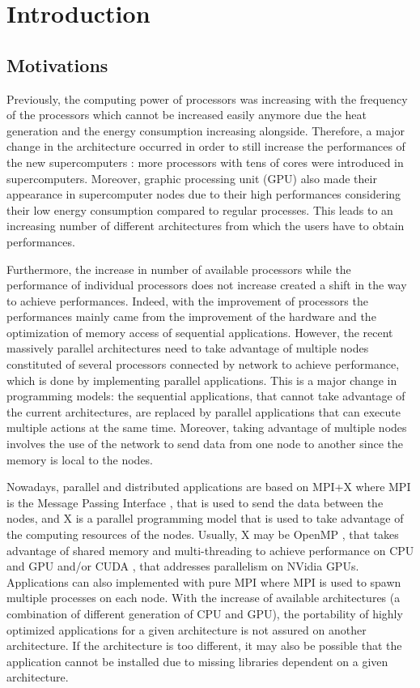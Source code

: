 \chapter{Introduction}

\section{Motivations}
Previously, the computing power of processors was increasing with the frequency of the processors which cannot be increased easily anymore due the heat generation and the energy consumption increasing alongside.
Therefore, a major change in the architecture occurred in order to still increase the performances of the new supercomputers : more processors with tens of cores were introduced in supercomputers.
Moreover, graphic processing unit (GPU) also made their appearance in supercomputer nodes due to their high performances considering their low energy consumption compared to regular processes.
This leads to an increasing number of different architectures from which the users have to obtain performances.

Furthermore, the increase in number of available processors while the performance of individual processors does not increase created a shift in the way to achieve performances.
Indeed, with the improvement of processors the performances mainly came from the improvement of the hardware and the optimization of memory access of sequential applications.
However, the recent massively parallel architectures need to take advantage of multiple nodes constituted of several processors connected by network to achieve performance, which is done by implementing parallel applications.
This is a major change in programming models: the sequential applications, that cannot take advantage of the current architectures, are replaced by parallel applications that can execute multiple actions at the same time.
Moreover, taking advantage of multiple nodes involves the use of the network to send data from one node to another since the memory is local to the nodes.

Nowadays, parallel and distributed applications are based on MPI+X where MPI is the Message Passing Interface \cite{MPIForum}, that is used to send the data between the nodes, and X is a parallel programming model that is used to take advantage of the computing resources of the nodes.
Usually, X may be OpenMP \cite{DaguM1998}, that takes advantage of shared memory and multi-threading to achieve performance on CPU and GPU and/or CUDA \cite{Shane2012}, that addresses parallelism on NVidia GPUs.
Applications can also implemented with pure MPI where MPI is used to spawn multiple processes on each node.
With the increase of available architectures (a combination of different generation of CPU and GPU), the portability of highly optimized applications for a given architecture is not assured on another architecture.
If the architecture is too different, it may also be possible that the application cannot be installed due to missing libraries dependent on a given architecture.

